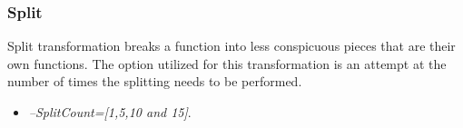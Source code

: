 \subsubsection{Split}
Split transformation breaks a function into less conspicuous pieces that are their own functions. The option utilized for this transformation is an attempt at the number of times the splitting needs to be performed. 

\begin{itemize}
\item \textit{--SplitCount=[1,5,10 and 15]}.
\end{itemize}

